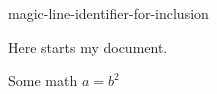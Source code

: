 \documentclass[varwidth=15cm,margin=0.07cm]{standalone}
\def\chcdisplayskipadjust{%
  \setlength{\abovedisplayskip}{4pt}%
  \setlength{\belowdisplayskip}{4pt}%
  \setlength{\abovedisplayshortskip}{4pt}%
  \setlength{\belowdisplayshortskip}{4pt}%
}%
\begin{document}
\chcdisplayskipadjust{}%

magic-line-identifier-for-inclusion


Here starts my document.

Some math $a=b^2$
\end{document}
